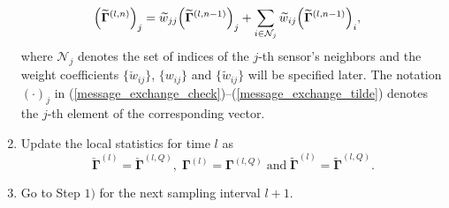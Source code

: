 \documentclass[11pt, draftclsnofoot, onecolumn]{IEEEtran}
\newcommand{\cN}{\mathcal{N}}
\newcommand{\bGamma}{{\boldsymbol{\Gamma}}}
\newcommand{\cbGamma}{{\check{\boldsymbol{\Gamma}}}}
\newcommand{\tbGamma}{{\widetilde{\boldsymbol{\Gamma}}}}
\newcommand{\cw}{{\check{w}}}
\newcommand{\tw}{{\widetilde{w}}}
\begin{document}
\begin{enumerate}[1)]
\begin{align}
	 {\left( {{\tbGamma ^{\left( {l,n} \right)}}} \right)_j} & = {\tw_{jj}}{\left( {{\tbGamma ^{\left( {l,n - 1} \right)}}} \right)_j} + \sum\limits_{i \in {{\cal N}_j}} {{\tw_{ij}}{{\left( {{\tbGamma ^{\left( {l,n - 1} \right)}}} \right)}_i}}, 
	\end{align}
	where $\cN_j$ denotes the set of indices of the $j$-th sensor's neighbors and the weight coefficients $\{\cw_{ij}\}$, $\{w_{ij}\}$ and $\{\tw_{ij}\}$ will be specified later. The notation $(\cdot)_j$ in (\ref{message_exchange_check})--(\ref{message_exchange_tilde})  denotes the $j$-th element of the corresponding vector.
	\item Update the local statistics for time $l$ as
	\begin{equation}
	{\cbGamma ^{\left( l \right)}} = {\cbGamma ^{\left( {l,Q} \right)}}, \; {\bGamma ^{\left( l \right)}} = {\bGamma ^{\left( {l,Q} \right)}} \; \text{and} \; {\tbGamma ^{\left( l \right)}} = {\tbGamma ^{\left( {l,Q} \right)}}.
	\end{equation}
	\item Go to Step $1)$ for the next sampling interval $l + 1$.
\end{enumerate}
\end{document}
